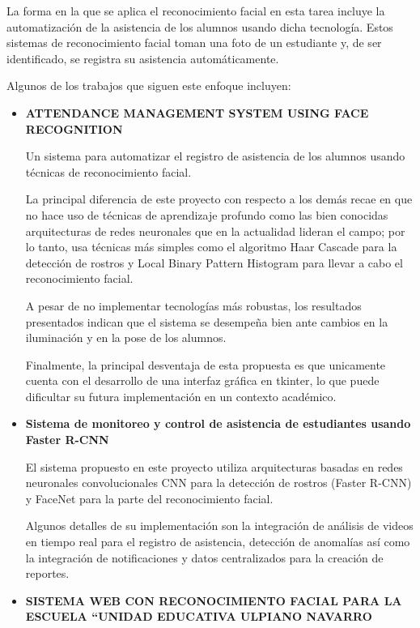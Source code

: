 La forma en la que se aplica el reconocimiento facial en esta tarea incluye la automatización de la asistencia de los alumnos usando dicha tecnología.
Estos sistemas de reconocimiento facial toman una foto de un estudiante y, de ser identificado, se registra su asistencia automáticamente.

Algunos de los trabajos que siguen este enfoque incluyen:

\begin{itemize}
	
	\item \textbf{ATTENDANCE MANAGEMENT SYSTEM USING FACE RECOGNITION \cite{EA1}}
	
	Un sistema para automatizar el registro de asistencia de los alumnos usando técnicas de reconocimiento facial.
	
	La principal diferencia de este proyecto con respecto a los demás recae en que no hace uso de técnicas de aprendizaje profundo como las bien conocidas arquitecturas de redes neuronales que en la actualidad lideran el campo; por lo tanto, usa técnicas más simples como el algoritmo Haar Cascade para la detección de rostros y Local Binary Pattern Histogram para llevar a cabo el reconocimiento facial.
	
	A pesar de no implementar tecnologías más robustas, los resultados presentados indican que el sistema se desempeña bien ante cambios en la iluminación y en la pose de los alumnos.
	
	Finalmente, la principal desventaja de esta propuesta es que unicamente cuenta con el desarrollo de una interfaz gráfica en tkinter, lo que puede dificultar su futura implementación en un contexto académico.
	
	
	\item \textbf{Sistema de monitoreo y control de asistencia de estudiantes usando Faster R-CNN \cite{EA2}}
	
	El sistema propuesto en este proyecto utiliza arquitecturas basadas en redes neuronales convolucionales CNN para la detección de rostros (Faster R-CNN) y FaceNet para la parte del reconocimiento facial.
	
	Algunos detalles de su implementación son la integración de análisis de videos en tiempo real para el registro de asistencia, detección de anomalías así como la integración de notificaciones y datos centralizados para la creación de reportes.
	
	
	\item \textbf{SISTEMA WEB CON RECONOCIMIENTO FACIAL PARA LA ESCUELA “UNIDAD EDUCATIVA ULPIANO NAVARRO \cite{EA3}}
	

\end{itemize}
